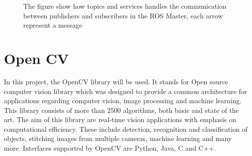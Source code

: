 \begin{figure}[H]

    \caption{The figure show how topics and services handles the communication between publishers and subscribers in the ROS Master, each arrow represent a message}
    \label{fig:ROSStructure}
\end{figure}



\section{Open CV} 
In this project, the OpenCV library will be used.  It stands for Open source computer vision library which was designed to provide a common architecture for applications regarding computer vision, image processing and machine learning. This library consists of more than 2500 algorithms, both basic and state of the art. The aim of this library are real-time vision applications with emphasis on computational efficiency. These include detection, recognition and classification of objects, stitching images from multiple cameras, machine learning and many more. Interfaces supported by OpenCV are Python, Java, C and C++. 

\color{black}